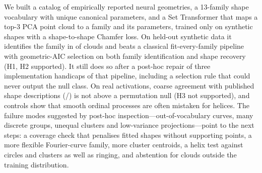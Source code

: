 We built a catalog of empirically reported neural geometries, a 13-family shape vocabulary with unique canonical parameters, and a Set Transformer that maps a top-3 PCA point cloud to a family and its parameters, trained only on synthetic shapes with a shape-to-shape Chamfer loss. On held-out synthetic data it identifies the family in \accMethod{} of clouds and beats a classical fit-every-family pipeline with geometric-AIC selection on both family identification and shape recovery (H1, H2 supported). It still does so after a post-hoc repair of three implementation handicaps of that pipeline, including a selection rule that could never output the null class. On real activations, coarse agreement with published shape descriptions (\hthreeAgree{}/\hthreeN{}) is not above a permutation null (H3 not supported), and controls show that smooth ordinal processes are often mistaken for helices. The failure modes suggested by post-hoc inspection---out-of-vocabulary curves, many discrete groups, unequal clusters and low-variance projections---point to the next steps: a coverage check that penalises fitted shapes without supporting points, a more flexible Fourier-curve family, more cluster centroids, a helix test against circles and clusters as well as ringing, and abstention for clouds outside the training distribution.
